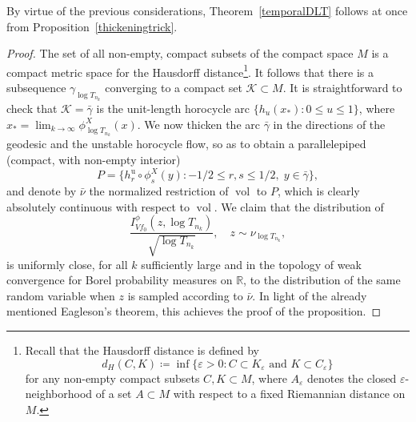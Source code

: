 \documentclass[11pt]{article}
\newcommand \R{\mathbb{R}}
\DeclareMathOperator{\vol}{vol}
\theoremstyle{definition}
\begin{document}
\begin{appendix}
By virtue of the previous considerations, Theorem~\ref{temporalDLT} follows at once from Proposition~\ref{thickeningtrick}.

\begin{proof}
The set of all non-empty, compact subsets of the compact space $M$ is a compact metric space for the Hausdorff distance\footnote{Recall that the Hausdorff distance is defined by
\begin{equation*}
d_H(C,K)\coloneqq\inf\{\varepsilon >0:C\subset K_{\varepsilon} \text{ and }K\subset C_{\varepsilon} \}
\end{equation*}
for any non-empty compact subsets $C,K\subset M$, where $A_{\varepsilon }$ denotes the closed $\varepsilon $-neighborhood of a set $A\subset M$ with respect to a fixed Riemannian distance on $M$.}. It follows that there is a subsequence $\gamma_{\log{T_{n_k}}}$ converging to a compact set $\mathcal{K}\subset M$. It is straightforward to check that $\mathcal{K}=\bar{\gamma}$ is the unit-length horocycle arc $\{h_{u}(x_{*}):0\leq u\leq 1 \}$, where $x_*=\lim_{k\to\infty}\phi^{X}_{\log{T_{n_k}}}(x)$.
We now thicken the arc $\bar{\gamma}$ in the directions of the geodesic and the unstable horocycle flow, so as to obtain a parallelepiped (compact, with non-empty interior)
\begin{equation}
\label{parallelepiped}
P=\{h^{\mathrm{u}}_{r}\circ \phi^{X}_s (y):-1/2\leq r,s\leq 1/2,\;y\in \bar{\gamma} \},
\end{equation}
and denote by $\bar{\nu}$ the normalized restriction of $\vol$ to $P$, which is clearly absolutely continuous with respect to $\vol$. We claim that the distribution of
\[
\frac{I_{Vf_0}^{\phi}(z,\log{T_{n_k}})}{\sqrt{\log{T_{n_k}}}},\quad z\sim \nu_{\log{T_{n_k}}},
\]
is uniformly close, for all $k$ sufficiently large and in the topology of weak convergence for Borel probability measures on $\R$, to the distribution of the same random variable when $z$ is sampled according to $\bar{\nu}$. In light of the already mentioned Eagleson's theorem, this achieves the proof of the proposition.


\end{proof}
\end{appendix}
\end{document}
